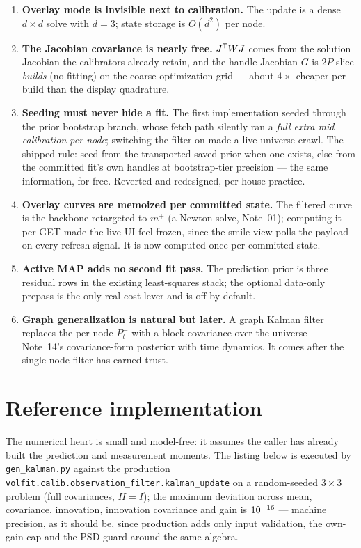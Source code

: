 \documentclass[11pt]{article}
\begin{document}
\begin{enumerate}[leftmargin=1.6em]
\item \textbf{Overlay mode is invisible next to calibration.} The update is a
dense $d\times d$ solve with $d=3$; state storage is $O(d^2)$ per node.
\item \textbf{The Jacobian covariance is nearly free.} $J^{\mathsf{T}} WJ$ comes from the
solution Jacobian the calibrators already retain, and the handle Jacobian $G$
is $2P$ slice \emph{builds} (no fitting) on the coarse optimization grid ---
about $4\times$ cheaper per build than the display quadrature.
\item \textbf{Seeding must never hide a fit.} The first implementation seeded
through the prior bootstrap branch, whose fetch path silently ran a \emph{full
extra mid calibration per node}; switching the filter on made a live universe
crawl. The shipped rule: seed from the transported saved prior when one
exists, else from the committed fit's own handles at bootstrap-tier precision
--- the same information, for free. Reverted-and-redesigned, per house
practice.
\item \textbf{Overlay curves are memoized per committed state.} The filtered
curve is the backbone retargeted to $m^+$ (a Newton solve, Note~01); computing
it per GET made the live UI feel frozen, since the smile view polls the
payload on every refresh signal. It is now computed once per committed state.
\item \textbf{Active MAP adds no second fit pass.} The prediction prior is
three residual rows in the existing least-squares stack; the optional
data-only prepass is the only real cost lever and is off by default.
\item \textbf{Graph generalization is natural but later.} A graph Kalman
filter replaces the per-node $P_t^-$ with a block covariance over the universe
--- Note~14's covariance-form posterior with time dynamics. It comes after the
single-node filter has earned trust.
\end{enumerate}

\section{Reference implementation}
\label{app:ref}

The numerical heart is small and model-free: it assumes the caller has already
built the prediction and measurement moments. The listing below is executed by
\texttt{gen\_kalman.py} against the production
\texttt{volfit.calib.observation\_filter.kalman\_update} on a random-seeded
$3\times3$ problem (full covariances, $H=I$); the maximum deviation across
mean, covariance, innovation, innovation covariance and gain is
$10^{-16}$ --- machine precision, as it should be, since production
adds only input validation, the own-gain cap and the PSD guard around the same
algebra.
\end{document}
